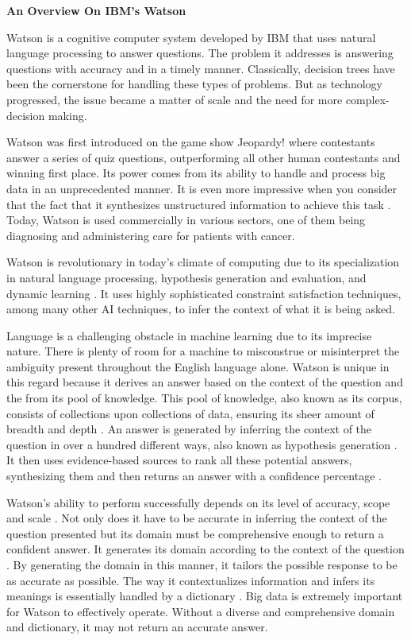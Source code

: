 \begin{center}
    \large{\textbf{An Overview On IBM's Watson \break}}
\end{center}

Watson is a cognitive computer system developed by IBM that uses natural language processing to answer questions. The problem it addresses is answering questions with accuracy and in a timely manner. Classically, decision trees have been the cornerstone for handling these types of problems. But as technology progressed, the issue became a matter of scale and the need for more complex-decision making. 

Watson was first introduced on the game show Jeopardy! where contestants answer a series of quiz questions, outperforming all other human contestants and winning first place. Its power comes from its ability to handle and process big data in an unprecedented manner. It is even more impressive when you consider that the fact that it synthesizes unstructured information to achieve this task \cite{ferrucci}. Today, Watson is used commercially in various sectors, one of them being diagnosing and administering care for patients with cancer. 

Watson is revolutionary in today’s climate of computing due to its specialization in natural language processing, hypothesis generation and evaluation, and dynamic learning \cite{high}. It uses highly sophisticated constraint satisfaction techniques, among many other AI techniques, to infer the context of what it is being asked.

Language is a challenging obstacle in machine learning due to its imprecise nature. There is plenty of room for a machine to misconstrue or misinterpret the ambiguity present throughout the English language alone. Watson is unique in this regard because it derives an answer based on the context of the question and the from its pool of knowledge. This pool of knowledge, also known as its corpus, consists of collections upon collections of data, ensuring its sheer amount of breadth and depth \cite{high}. An answer is generated by inferring the context of the question in over a hundred different ways, also known as hypothesis generation \cite{ferrucci}. It then uses evidence-based sources to rank all these potential answers, synthesizing them and then returns an answer with a confidence percentage \cite{high}. 

Watson’s ability to perform successfully depends on its level of accuracy, scope and scale \cite{high}. Not only does it have to be accurate in inferring the context of the question presented but its domain must be comprehensive enough to return a confident answer. It generates its domain according to the context of the question \cite{chen}. By generating the domain in this manner, it tailors the possible response to be as accurate as possible. The way it contextualizes information and infers its meanings is essentially handled by a dictionary \cite{chen}. Big data is extremely important for Watson to effectively operate. Without a diverse and comprehensive domain and dictionary, it may not return an accurate answer. 
	
